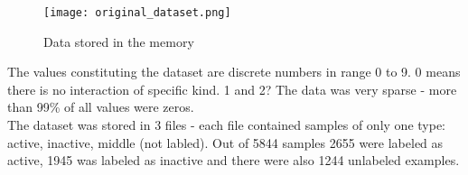 \documentclass[a4paper,10pt]{report}
\begin{document}
	\begin{figure}[h!]
	  \centering
	  \texttt{[image: original\_dataset.png]}
	  \caption{Data stored in the memory}
	  \label{fig:data_original}
	\end{figure} 
	
	The values constituting the dataset are discrete numbers in range 0 to 9. 0 means there is no interaction of specific kind. 1 and 2? The data was very sparse - more than 99\% of all values were zeros.\\
	
	The dataset was stored in 3 files - each file contained samples of only one type: active, inactive, middle (not labled). Out of 5844 samples 2655 were labeled as active, 1945 was labeled as inactive and there were also 1244 unlabeled examples.\\
	

	

	    
           
	    
\end{document}
